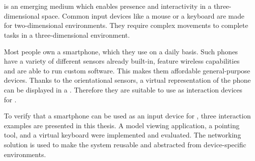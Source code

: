 \chapter{\abstractname}

 is an emerging medium which enables presence and interactivity in a three-dimensional space. Common input devices like a mouse or a keyboard are made for two-dimensional environments. They require complex movements to complete tasks in a three-dimensional environment.%

Most people own a smartphone, which they use on a daily basis. Such phones have a variety of different sensors already built-in, feature wireless capabilities and are able to run custom software. This makes them affordable general-purpose devices. Thanks to the orientational sensors, a virtual representation of the phone can be displayed in a . Therefore they are suitable to use as interaction devices for .

To verify that a smartphone can be used as an input device for , three interaction examples are presented in this thesis. A model viewing application, a pointing tool, and a virtual keyboard were implemented and evaluated. The  networking solution is used to make the system reusable and abstracted from device-specific environments.